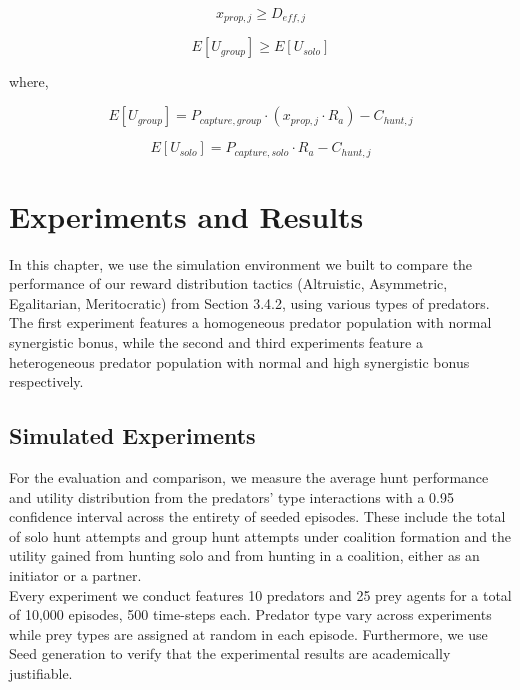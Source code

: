 \documentclass[12pt,a4paper]{report}
\begin{document}
	\begin{equation}\label{eq:bargaining_check}
		x_{prop,j} \geq D_{eff,j}
	\end{equation}
	
	\vspace{1em}
	
	\begin{equation} \label{eq:utility_check}
		E[U_{group}] \geq E[U_{solo}]
	\end{equation}
	
	 where,
	
	\[ E[U_{group}] = P_{capture, group} \cdot (x_{prop,j} \cdot R_{a}) - C_{hunt,j} \]
	
	\[ E[U_{solo}] = P_{capture, solo} \cdot R_{a} - C_{hunt,j} \]
	
	\vspace{1em}
	
	\chapter{Experiments and Results}
	\label{ch:simulations}
	In this chapter, we use the simulation environment we built to compare the performance of our reward distribution tactics (Altruistic, Asymmetric, Egalitarian, Meritocratic) from Section 3.4.2, using various types of predators. The first experiment features a homogeneous predator population with normal synergistic bonus, while the second and third experiments feature a heterogeneous predator population with normal and high synergistic bonus respectively.

	\section{Simulated Experiments}

	For the evaluation and comparison, we measure the average hunt performance and utility distribution from the predators' type interactions with a 0.95 confidence interval across the entirety of seeded episodes. These include the total of solo hunt attempts and group hunt attempts under coalition formation and the utility gained from hunting solo and from hunting in a coalition, either as an initiator or a partner. \\
	
	Every experiment we conduct features 10 predators and 25 prey agents for a total of 10,000 episodes, 500 time-steps each. Predator type vary across experiments while prey types are assigned at random in each episode. Furthermore, we use Seed generation to verify that the experimental results are academically justifiable. \\
	
\end{document}
